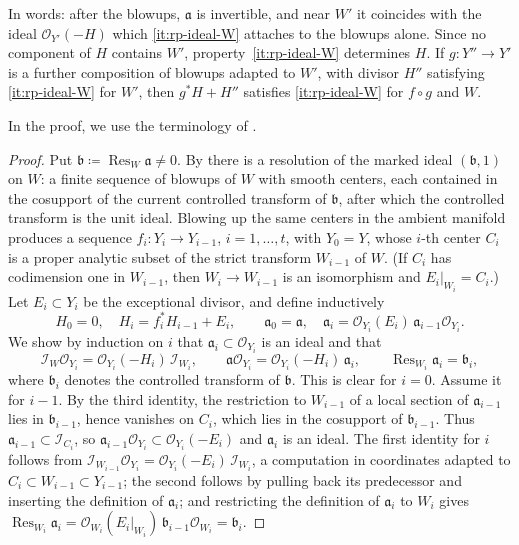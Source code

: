 \documentclass[11pt,a4paper]{amsart}
\newcommand{\rest}[1]{\operatorname{Res}_{#1}}   %
\theoremstyle{definition}
\begin{document}
In words: after the blowups, $\mathfrak a$ is invertible, and near $W'$ it
coincides with the ideal $\mathcal O_{Y'}(-H)$ which
\ref{it:rp-ideal-W} attaches to the blowups alone. Since no component of
$H$ contains $W'$, property~\ref{it:rp-ideal-W} determines $H$. If
$g\colon Y''\to Y'$ is a further composition of blowups adapted to $W'$,
with divisor $H''$ satisfying \ref{it:rp-ideal-W} for $W'$, then
$g^*H+H''$ satisfies \ref{it:rp-ideal-W} for $f\circ g$ and $W$.

In the proof, we use the terminology of \cite{BM08,Wlo05}.

\begin{proof}
Put $\mathfrak b\coloneqq \rest W\mathfrak a\ne0$. By \cite[Theorem~1.3]{BM08}
there is a resolution of the marked ideal $(\mathfrak b,1)$ on $W$: a
finite sequence of blowups of $W$ with smooth centers, each contained
in the cosupport of the current controlled transform of $\mathfrak b$,
after which the controlled transform is the unit ideal. Blowing up the
same centers in the ambient manifold produces a sequence
$f_i\colon Y_i\to Y_{i-1}$, $i=1,\dots,t$, with $Y_0=Y$, whose
$i$-th center $C_i$ is a proper analytic subset of the strict
transform $W_{i-1}$ of $W$. (If $C_i$ has codimension one in
$W_{i-1}$, then $W_i\to W_{i-1}$ is an isomorphism and $E_i|_{W_i}=C_i$.)
Let $E_i\subset Y_i$ be the exceptional divisor, and define inductively
\[
  H_0=0,\quad H_i=f_i^*H_{i-1}+E_i,\qquad
  \mathfrak a_0=\mathfrak a,\quad
  \mathfrak a_i=\mathcal O_{Y_i}(E_i)\,\mathfrak a_{i-1}\mathcal O_{Y_i}.
\]
We show by induction on $i$ that $\mathfrak a_i\subset\mathcal O_{Y_i}$ is
an ideal and that
\begin{equation}\label{eq:rp-induction}
  \mathcal I_W\mathcal O_{Y_i}=\mathcal O_{Y_i}(-H_i)\,\mathcal I_{W_i},\qquad
  \mathfrak a\mathcal O_{Y_i}=\mathcal O_{Y_i}(-H_i)\,\mathfrak a_i,\qquad
  \rest{W_i}\mathfrak a_i=\mathfrak b_i,
\end{equation}
where $\mathfrak b_i$ denotes the controlled transform of $\mathfrak b$.
This is clear for $i=0$. Assume it for $i-1$. By the third identity, the
restriction to $W_{i-1}$ of a local section of $\mathfrak a_{i-1}$ lies in
$\mathfrak b_{i-1}$, hence vanishes on $C_i$, which lies in the
cosupport of $\mathfrak b_{i-1}$. Thus $\mathfrak a_{i-1}\subset\mathcal
I_{C_i}$, so $\mathfrak a_{i-1}\mathcal O_{Y_i}\subset\mathcal
O_{Y_i}(-E_i)$ and $\mathfrak a_i$ is an ideal. The first identity for $i$
follows from
$\mathcal I_{W_{i-1}}\mathcal O_{Y_i}=\mathcal O_{Y_i}(-E_i)\,\mathcal I_{W_i}$,
a computation in coordinates adapted to $C_i\subset W_{i-1}\subset Y_{i-1}$;
the second follows by pulling back its predecessor and inserting the
definition of $\mathfrak a_i$; and restricting the definition of
$\mathfrak a_i$ to $W_i$ gives
$\rest{W_i}\mathfrak a_i=\mathcal O_{W_i}(E_i|_{W_i})\,\mathfrak b_{i-1}\mathcal O_{W_i}
=\mathfrak b_i$.


\end{proof}
\end{document}
